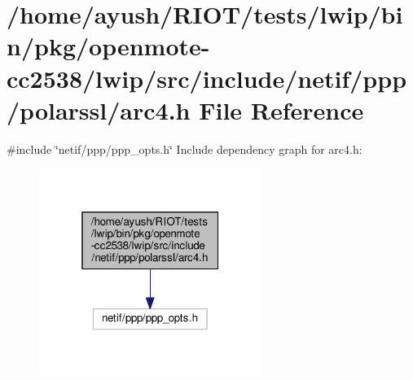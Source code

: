 \hypertarget{openmote-cc2538_2lwip_2src_2include_2netif_2ppp_2polarssl_2arc4_8h}{}\section{/home/ayush/\+R\+I\+O\+T/tests/lwip/bin/pkg/openmote-\/cc2538/lwip/src/include/netif/ppp/polarssl/arc4.h File Reference}
\label{openmote-cc2538_2lwip_2src_2include_2netif_2ppp_2polarssl_2arc4_8h}
{\ttfamily \#include \char`\"{}netif/ppp/ppp\+\_\+opts.\+h\char`\"{}}\newline
Include dependency graph for arc4.\+h\+:
\nopagebreak
\begin{figure}[H]
\begin{center}
\leavevmode
\includegraphics[width=205pt]{openmote-cc2538_2lwip_2src_2include_2netif_2ppp_2polarssl_2arc4_8h__incl}
\end{center}
\end{figure}
